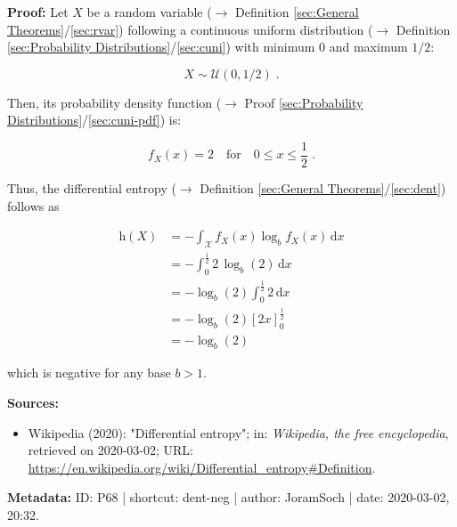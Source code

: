 \documentclass[a4paper,12pt,twoside]{book}
\begin{document}
\vspace{1em}
\textbf{Proof:} Let $X$ be a random variable ($\rightarrow$ Definition \ref{sec:General Theorems}/\ref{sec:rvar}) following a continuous uniform distribution ($\rightarrow$ Definition \ref{sec:Probability Distributions}/\ref{sec:cuni}) with minimum $0$ and maximum $1/2$:

\begin{equation} \label{eq:dent-neg-X}
X \sim \mathcal{U}(0, 1/2) \; .
\end{equation}

Then, its probability density function ($\rightarrow$ Proof \ref{sec:Probability Distributions}/\ref{sec:cuni-pdf}) is:

\begin{equation} \label{eq:dent-neg-X-pdf}
f_X(x) = 2 \quad \text{for} \quad 0 \leq x \leq \frac{1}{2} \; .
\end{equation}

Thus, the differential entropy ($\rightarrow$ Definition \ref{sec:General Theorems}/\ref{sec:dent}) follows as

\begin{equation} \label{eq:dent-neg-X-dent}
\begin{split}
\mathrm{h}(X) &= - \int_{\mathcal{X}} f_X(x) \log_b f_X(x) \, \mathrm{d}x \\
&= - \int_{0}^{\frac{1}{2}} 2 \, \log_b(2) \, \mathrm{d}x \\
&= -\log_b(2) \int_{0}^{\frac{1}{2}} 2 \, \mathrm{d}x \\
&= -\log_b(2) \left[ 2x \right]_{0}^{\frac{1}{2}} \\
&= -\log_b(2)
\end{split}
\end{equation}

which is negative for any base $b > 1$.


\vspace{1em}
\textbf{Sources:}
\begin{itemize}
\item Wikipedia (2020): "Differential entropy"; in: \textit{Wikipedia, the free encyclopedia}, retrieved on 2020-03-02; URL: \url{https://en.wikipedia.org/wiki/Differential_entropy#Definition}.
\end{itemize}


\vspace{1em}
\textbf{Metadata:} ID: P68 | shortcut: dent-neg | author: JoramSoch | date: 2020-03-02, 20:32.
\vspace{1em}
\end{document}
